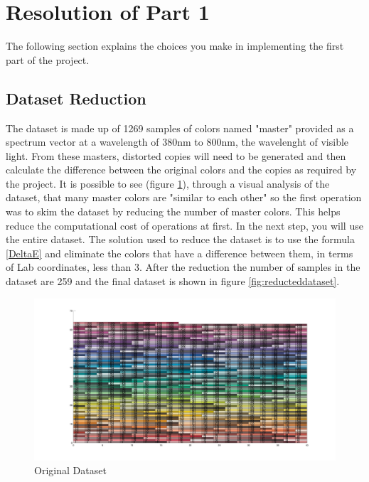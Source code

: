 \documentclass{article}
\begin{document}
\section{Resolution of Part 1}
The following section explains the choices you make in implementing the first part of the project.

\subsection{Dataset Reduction} 
The dataset is made up of 1269 samples of colors named "master" provided as a spectrum vector at a wavelength of 380nm to 800nm, the wavelenght of visible light. From these masters, distorted copies will need to be generated and then calculate the difference between the original colors and the copies as required by the project. It is possible to see (figure \ref{fig:dataset}), through a visual analysis of the dataset, that many master colors are "similar to each other" so the first operation was to skim the dataset by reducing the number of master colors. This helps reduce the computational cost of operations at first. In the next step, you will use the entire dataset. The solution used to reduce the dataset is to use the formula \ref{DeltaE} and eliminate the colors that have a difference between them, in terms of Lab coordinates, less than 3. After the reduction the number of samples in the dataset are 259 and the final dataset is shown in figure \ref{fig:reducteddataset}.
\begin{figure}
  \includegraphics[width=\linewidth]{img/dataset.jpg}
  \caption{Original Dataset}
  \label{fig:dataset}
\end{figure}
\end{document}
